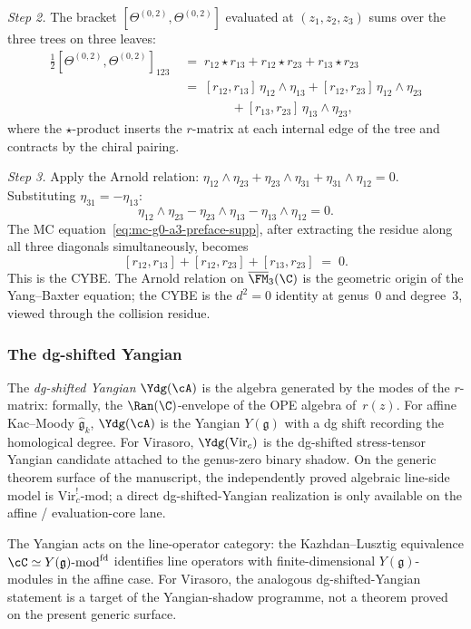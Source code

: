 \emph{Step 2.}\enspace
The bracket $[\Theta^{(0,2)},\Theta^{(0,2)}]$ evaluated at
$(z_1,z_2,z_3)$ sums over the three trees on three leaves:
\begin{align*}
\tfrac{1}{2}[\Theta^{(0,2)},\Theta^{(0,2)}]_{123}
&\;=\;
r_{12}\star r_{13}
+r_{12}\star r_{23}
+r_{13}\star r_{23}\\[4pt]
&\;=\;
[r_{12},r_{13}]\,\eta_{12}\wedge\eta_{13}
+[r_{12},r_{23}]\,\eta_{12}\wedge\eta_{23}\\
&\qquad\qquad
+[r_{13},r_{23}]\,\eta_{13}\wedge\eta_{23},
\end{align*}
where the $\star$-product inserts the $r$-matrix at each internal
edge of the tree and contracts by the chiral pairing.

\emph{Step 3.}\enspace
Apply the Arnold relation:
$\eta_{12}\wedge\eta_{23}
+\eta_{23}\wedge\eta_{31}
+\eta_{31}\wedge\eta_{12}=0$.
Substituting $\eta_{31}=-\eta_{13}$:
\[
\eta_{12}\wedge\eta_{23}
-\eta_{23}\wedge\eta_{13}
-\eta_{13}\wedge\eta_{12}
=0.
\]
The MC equation~\eqref{eq:mc-g0-a3-preface-supp}, after extracting
the residue along all three diagonals simultaneously, becomes
\[
[r_{12},r_{13}]+[r_{12},r_{23}]+[r_{13},r_{23}]
\;=\;0.
\]
This is the CYBE. The Arnold relation on $\overline{\FM}_3(\C)$
is the geometric origin of the Yang--Baxter equation; the CYBE
is the $d^2=0$ identity at genus~$0$ and degree~$3$, viewed
through the collision residue.

\subsubsection*{The dg-shifted Yangian}

The \emph{dg-shifted Yangian} $\Ydg(\cA)$ is the algebra
generated by the modes of the $r$-matrix: formally, the
$\Ran(\C)$-envelope of the OPE algebra of~$r(z)$. For affine
Kac--Moody $\widehat{\mathfrak g}_k$, $\Ydg(\cA)$ is the
Yangian $Y(\mathfrak g)$ with a dg shift recording the
homological degree. For Virasoro, $\Ydg(\mathrm{Vir}_c)$ is
the dg-shifted stress-tensor Yangian candidate attached to the
genus-zero binary shadow. On the generic theorem surface of the
manuscript, the independently proved algebraic line-side model is
$\mathrm{Vir}_c^!\text{-}\mathrm{mod}$; a direct dg-shifted-Yangian
realization is only available on the affine / evaluation-core lane.

The Yangian acts on the line-operator category: the
Kazhdan--Lusztig equivalence
$\cC\simeq Y(\mathfrak g)\text{-mod}^{\mathrm{fd}}$
identifies line operators with finite-dimensional
$Y(\mathfrak g)$-modules in the affine case. For Virasoro, the
analogous dg-shifted-Yangian statement is a target of the
Yangian-shadow programme, not a theorem proved on the present
generic surface.

